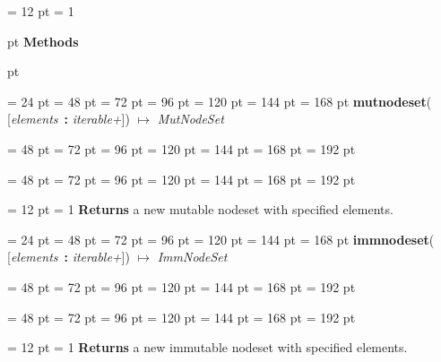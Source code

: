 {{\par}
{\par \pagebreak[3.300000] \noindent \hangindent = 12 pt \hangafter = 1 
{\par \pagebreak[3]  pt \noindent
{\Large {\bf Methods\/}}\par {} pt
} \noindent
\par}
{\par \noindent  \leftskip = 24 pt  \leftmargini = 48 pt  \leftmarginii = 72 pt  \leftmarginiii = 96 pt  \leftmarginiv = 120 pt  \leftmarginv = 144 pt  \leftmarginvi = 168 pt {\bf {\large {\bf mutnodeset\/}}\/}( {[}{\em elements\/}~{\bf :}  {\em iterable+\/}]) \(\mapsto \)  {\em MutNodeSet\/}{\par \noindent
{\par \noindent  \leftskip = 48 pt  \leftmargini = 72 pt  \leftmarginii = 96 pt  \leftmarginiii = 120 pt  \leftmarginiv = 144 pt  \leftmarginv = 168 pt  \leftmarginvi = 192 pt {\par \noindent
\par}
\par}
{\par \noindent  \leftskip = 48 pt  \leftmargini = 72 pt  \leftmarginii = 96 pt  \leftmarginiii = 120 pt  \leftmarginiv = 144 pt  \leftmarginv = 168 pt  \leftmarginvi = 192 pt {\par \noindent
{\par \pagebreak[3.100000] \noindent \hangindent = 12 pt \hangafter = 1 
{\bf Returns \/} a new mutable nodeset with specified elements.
\par}
\par}
\par}
\par}
\par}
{\par \noindent  \leftskip = 24 pt  \leftmargini = 48 pt  \leftmarginii = 72 pt  \leftmarginiii = 96 pt  \leftmarginiv = 120 pt  \leftmarginv = 144 pt  \leftmarginvi = 168 pt {\bf {\large {\bf immnodeset\/}}\/}( {[}{\em elements\/}~{\bf :}  {\em iterable+\/}]) \(\mapsto \)  {\em ImmNodeSet\/}{\par \noindent
{\par \noindent  \leftskip = 48 pt  \leftmargini = 72 pt  \leftmarginii = 96 pt  \leftmarginiii = 120 pt  \leftmarginiv = 144 pt  \leftmarginv = 168 pt  \leftmarginvi = 192 pt {\par \noindent
\par}
\par}
{\par \noindent  \leftskip = 48 pt  \leftmargini = 72 pt  \leftmarginii = 96 pt  \leftmarginiii = 120 pt  \leftmarginiv = 144 pt  \leftmarginv = 168 pt  \leftmarginvi = 192 pt {\par \noindent
{\par \pagebreak[3.100000] \noindent \hangindent = 12 pt \hangafter = 1 
{\bf Returns \/} a new immutable nodeset with specified elements.
\par}
\par}
\par}
\par}
\par}
\par}
